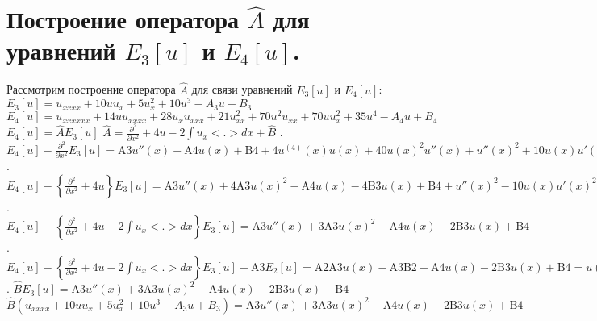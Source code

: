 \documentclass[14pt,a4paper]{article}
\begin{document}
\section{Построение оператора $\widehat{A}$ для уравнений $E_3 [u] $ и $E_4 [u]$.}
Рассмотрим построение оператора $\widehat{A}$ для связи уравнений $E_3 [u] $ и $E_4 [u]$:
\newline
$
E_3[u] = u_{xxxx} + 10u u_x + 5 u_{x}^{2} + 10u^3 - A_{3} u + B_{3}
$
\newline
$E_4[u] = u_{xxxxxx} + 14uu_{xxxx} + 28u_{x}u_{xxx} + 21u_{xx}^{2} + 70 u^2 u_{xx} + 70 u u_{x}^{2} + 35 u^4 - A_{4} u + B_{4}$
\newline
$ E_4[u] = \widehat{A} E_3[u]$
\newline
\newline
$\widehat{A} = \frac{\partial^2}{\partial x^2} + 4u - 2 \int u_{x} <.> dx + \widehat{B}$
\newline
{}. $E_4[u] - \frac{\partial^2}{\partial x^2} E_3[u] = 
   \text{A3} u''(x)-\text{A4} u(x)+\text{B4}+4 u^{(4)}(x) u(x)+40
    u(x)^2 u''(x)+u''(x)^2+10 u(x) u'(x)^2-2 u^{(3)}(x) u'(x)+35
    u(x)^4$
\newline
{}. $E_4[u] - \left\lbrace \frac{\partial^2}{\partial x^2} + 4u \right\rbrace E_3[u] = \text{A3} u''(x)+4 \text{A3} u(x)^2-\text{A4} u(x)-4 \text{B3}
    u(x)+\text{B4}+u''(x)^2-10 u(x) u'(x)^2-2 u^{(3)}(x) u'(x)-5
    u(x)^4$
\newline
{}. $E_4[u] - \left\lbrace \frac{\partial^2}{\partial x^2} + 4u - 2 \int u_{x} <.> dx \right\rbrace E_3[u] =  \text{A3} u''(x)+3 \text{A3} u(x)^2-\text{A4} u(x)-2 \text{B3}u(x)+\text{B4}$
\newline
{}. $E_4[u] - \left\lbrace \frac{\partial^2}{\partial x^2} + 4u - 2 \int u_{x} <.> dx \right\rbrace E_3[u] - \text{A3} E_2[u] = \text{A2} \text{A3} u(x)-\text{A3} \text{B2}-\text{A4} u(x)-2
    \text{B3} u(x)+\text{B4} = u(x) (\text{A2} \text{A3}-\text{A4}-2 \text{B3})-\text{A3}
    \text{B2}+\text{B4}$
\newline
{}. $\widehat{B}E_3 [u] = \text{A3} u''(x)+3 \text{A3} u(x)^2-\text{A4} u(x)-2 \text{B3}u(x)+\text{B4}$
\newline
$\widehat{B} (u_{xxxx} + 10u u_x + 5 u_{x}^{2} + 10u^3 - A_{3} u + B_{3}) = \text{A3} u''(x)+3 \text{A3} u(x)^2-\text{A4} u(x)-2 \text{B3}u(x)+\text{B4}$
\newline
\newline
\end{document}

